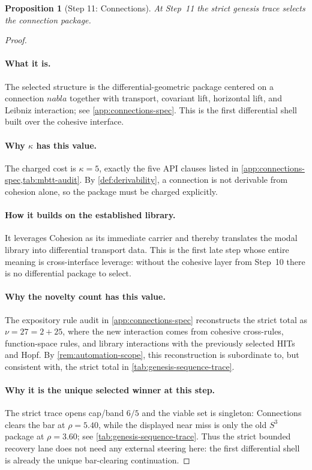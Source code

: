 \documentclass[11pt,a4paper]{article}
\def\nabla{nabla}%
\theoremstyle{plain}
\newtheorem{proposition}[theorem]{Proposition}
\theoremstyle{definition}
\theoremstyle{remark}
\begin{document}
\begin{proposition}[Step 11: Connections]
\label{prop:genesis-step11}
At Step~11 the strict genesis trace selects the connection package.
\end{proposition}

\begin{proof}
\paragraph{What it is.}
The selected structure is the differential-geometric package centered on a
connection $\nabla$ together with transport, covariant lift, horizontal lift,
and Leibniz interaction; see \cref{app:connections-spec}.
This is the first differential shell built over the cohesive interface.

\paragraph{Why $\kappa$ has this value.}
The charged cost is $\kappa=5$, exactly the five API clauses listed in
\cref{app:connections-spec,tab:mbtt-audit}.
By \cref{def:derivability}, a connection is not derivable from cohesion alone,
so the package must be charged explicitly.

\paragraph{How it builds on the established library.}
It leverages Cohesion as its immediate carrier and thereby translates the modal
library into differential transport data.
This is the first late step whose entire meaning is cross-interface leverage:
without the cohesive layer from Step~10 there is no differential package to
select.

\paragraph{Why the novelty count has this value.}
The expository rule audit in \cref{app:connections-spec} reconstructs the strict
total as $\nu=27=2+25$, where the new interaction comes from cohesive
cross-rules, function-space rules, and library interactions with the previously
selected HITs and Hopf.
By \cref{rem:automation-scope}, this reconstruction is subordinate to, but
consistent with, the strict total in \cref{tab:genesis-sequence-trace}.

\paragraph{Why it is the unique selected winner at this step.}
The strict trace opens cap/band $6/5$ and the viable set is singleton:
Connections clears the bar at $\rho=5.40$, while the displayed near miss is only
the old $S^3$ package at $\rho=3.60$; see
\cref{tab:genesis-sequence-trace}.
Thus the strict bounded recovery lane does not need any external steering here: the first
differential shell is already the unique bar-clearing continuation.
\end{proof}
\end{document}
